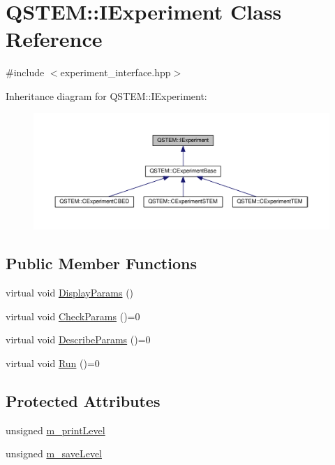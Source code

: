 \hypertarget{class_q_s_t_e_m_1_1_i_experiment}{\section{Q\-S\-T\-E\-M\-:\-:I\-Experiment Class Reference}
\label{class_q_s_t_e_m_1_1_i_experiment}
}


{\ttfamily \#include $<$experiment\-\_\-interface.\-hpp$>$}



Inheritance diagram for Q\-S\-T\-E\-M\-:\-:I\-Experiment\-:
\nopagebreak
\begin{figure}[H]
\begin{center}
\leavevmode
\includegraphics[width=350pt]{class_q_s_t_e_m_1_1_i_experiment__inherit__graph}
\end{center}
\end{figure}
\subsection*{Public Member Functions}
\begin{DoxyCompactItemize}
\item 
virtual void \hyperlink{class_q_s_t_e_m_1_1_i_experiment_a3478401e4d64dfef168f965a7fe6e1bb}{Display\-Params} ()
\item 
virtual void \hyperlink{class_q_s_t_e_m_1_1_i_experiment_a58dd007d7260a04ec939d3dd95fb303d}{Check\-Params} ()=0
\item 
virtual void \hyperlink{class_q_s_t_e_m_1_1_i_experiment_a596d3fb45526d029a0cdd8805c982c44}{Describe\-Params} ()=0
\item 
virtual void \hyperlink{class_q_s_t_e_m_1_1_i_experiment_add958cc05dc6f67b7e6a800d2649d579}{Run} ()=0
\end{DoxyCompactItemize}
\subsection*{Protected Attributes}
\begin{DoxyCompactItemize}
\item 
unsigned \hyperlink{class_q_s_t_e_m_1_1_i_experiment_ae362ace9a9a7384e6159d14a7a255c69}{m\-\_\-print\-Level}
\item 
unsigned \hyperlink{class_q_s_t_e_m_1_1_i_experiment_a9f3605b834d9bcaf1bdaca1af0622182}{m\-\_\-save\-Level}
\end{DoxyCompactItemize}


